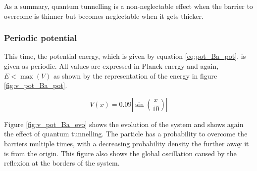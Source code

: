 \documentclass[a4paper,12pt,twoside]{article}
\newcommand{\bracket}[1]{\left(#1\right)}
\newcommand{\abs}[1]{\left|#1\right|}
\begin{document}

        As a summary, quantum tunnelling is a non-neglectable effect when the barrier to overcome is thinner but becomes neglectable when it gets thicker.

      \subsubsection{Periodic potential}
      This time, the potential energy, which is given by equation \eqref{eq:pot_Ba_pot}, is given as periodic.
      All values are expressed in Planck energy and again, $E<\max\bracket{V}$ as shown by the representation of the energy in figure \ref{fig:v_pot_Ba_pot}.

      \begin{equation}
        V(x) = 0.09\abs{\sin\bracket{\frac{x}{10}}}
        \label{eq:pot_Ba_pot}
      \end{equation}

      Figure \ref{fig:v_pot_Ba_evo} shows the evolution of the system and shows again the effect of quantum tunnelling.
      The particle has a probability to overcome the barriers multiple times, with a decreasing probability density the further away it is from the origin.
      This figure also shows the global oscillation caused by the reflexion at the borders of the system.
\end{document}
